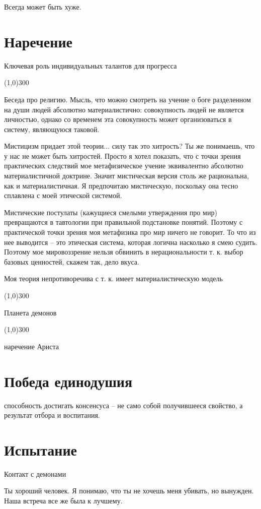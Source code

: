 \documentclass[12pt,a4paper]{article}
\newcommand{\sep}{
	\begin{center}
		\line(1,0){300}
	\end{center}
}
\begin{document}
Всегда может быть хуже.

\section*{Наречение}
Ключевая роль индивидуальных талантов для прогресса

\sep

Беседа про религию. Мысль, что можно смотреть на учение о боге разделенном на души людей абсолютно материалистично: совокупность людей не является личностью, однако со временем эта совокупность может организоваться в систему, являющуюся таковой.

Мистицизм придает этой теории... силу
так это хитрость?
Ты же понимаешь, что у нас не может быть хитростей. Просто я хотел показать, что с точки зрения практических следствий мое метафизическое учение эквивалентно абсолютно материалистичной доктрине. Значит мистическая версия столь же рациональна, как и материалистичная. Я предпочитаю мистическую, поскольку она тесно сплавлена с моей этической системой.

Мистические постулаты (кажущиеся смелыми утверждения про мир) превращаются в тавтологии при правильной подстановке понятий. Поэтому с практической точки зрения моя метафизика про мир ничего не говорит. То что из нее выводится -- это этическая система, которая логична насколько я смею судить. Поэтому мое мировоззрение нельзя обвинить в нерациональности т. к. выбор базовых ценностей, скажем так, дело вкуса.

Моя теория непротиворечива с т. к. имеет материалистическую модель
\sep

Планета демонов

\sep

наречение Ариста

\section*{Победа единодушия}

способность достигать консенсуса -- не само собой получившееся свойство, а результат отбора и воспитания.

\section*{Испытание}

Контакт с демонами

Ты хороший человек. Я понимаю, что ты не хочешь меня убивать, но вынужден. Наша встреча все же была к лучшему.
\end{document}
